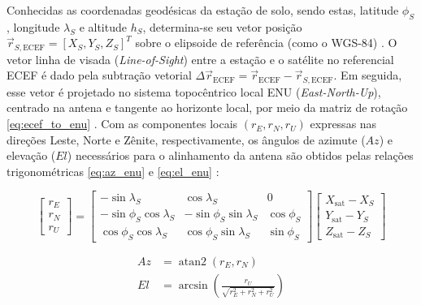 Conhecidas as coordenadas geodésicas da estação de solo, sendo estas, latitude $\phi_S$, longitude $\lambda_S$ e altitude $h_S$, determina-se seu vetor posição $\vec{r}_{S,\text{ECEF}} = [X_S, Y_S, Z_S]^T$ sobre o elipsoide de referência (como o WGS-84) \cite{vallado2013}.
O vetor linha de visada (\textit{Line-of-Sight}) entre a estação e o satélite no referencial ECEF é dado pela subtração vetorial $\Delta\vec{r}_{\text{ECEF}} = \vec{r}_{\text{ECEF}} - \vec{r}_{S,\text{ECEF}}$.
Em seguida, esse vetor é projetado no sistema topocêntrico local ENU (\textit{East-North-Up}), centrado na antena e tangente ao horizonte local, por meio da matriz de rotação \eqref{eq:ecef_to_enu} \cite{vallado2013}.
Com as componentes locais $(r_E, r_N, r_U)$ expressas nas direções Leste, Norte e Zênite, respectivamente, os ângulos de azimute ($Az$) e elevação ($El$) necessários para o alinhamento da antena são obtidos pelas relações trigonométricas \eqref{eq:az_enu} e \eqref{eq:el_enu} \cite{vallado2013}:

\begin{equation}
\begin{bmatrix} r_E \\ r_N \\ r_U \end{bmatrix}
=
\begin{bmatrix}
-\sin\lambda_S & \cos\lambda_S & 0 \\
-\sin\phi_S\cos\lambda_S & -\sin\phi_S\sin\lambda_S & \cos\phi_S \\
\cos\phi_S\cos\lambda_S & \cos\phi_S\sin\lambda_S & \sin\phi_S
\end{bmatrix}
\begin{bmatrix}
X_{\text{sat}} - X_S \\
Y_{\text{sat}} - Y_S \\
Z_{\text{sat}} - Z_S
\end{bmatrix}
\label{eq:ecef_to_enu}
\end{equation}

\begin{align}
Az &= \operatorname{atan2}(r_E, r_N) \label{eq:az_enu} \\
El &= \arcsin\left(\frac{r_U}{\sqrt{r_E^2 + r_N^2 + r_U^2}}\right) \label{eq:el_enu}
\end{align}

